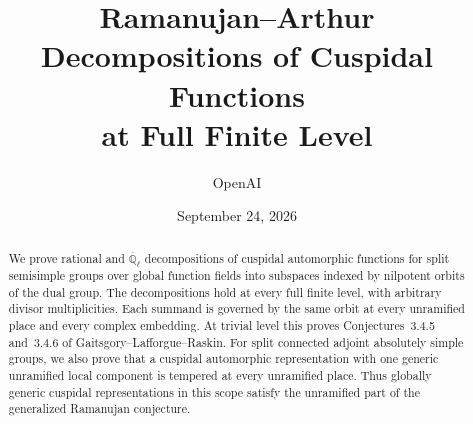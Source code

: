 \documentclass[11pt]{article}
\title{Ramanujan--Arthur Decompositions of Cuspidal Functions\\
at Full Finite Level}
\author{OpenAI}
\date{September 24, 2026}
\begin{document}
\maketitle
\begin{abstract}
We prove rational and $\overline{\mathbb Q}_\ell$ decompositions of cuspidal
automorphic functions for split semisimple groups over global function
fields into subspaces indexed by nilpotent orbits of the dual group.
The decompositions hold at every full finite level, with arbitrary divisor
multiplicities. Each summand is governed by the same orbit at every
unramified place and every complex embedding. At trivial level this
proves Conjectures~3.4.5 and~3.4.6 of Gaitsgory--Lafforgue--Raskin.
For split connected adjoint absolutely simple groups, we also prove that a
cuspidal automorphic representation with one generic unramified local
component is tempered at every unramified place. Thus globally generic
cuspidal representations in this scope satisfy the unramified part of the
generalized Ramanujan conjecture.
\end{abstract}
\tableofcontents








\end{document}
